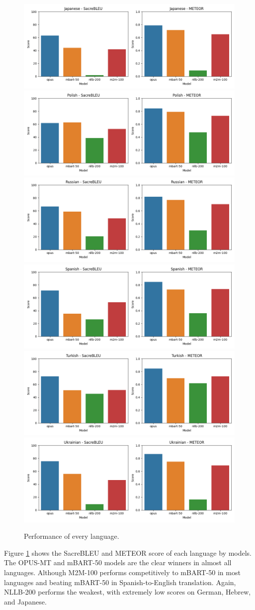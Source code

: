 \documentclass[a4paper]{article}
\begin{document}
\begin{figure}[htbp]
    \includegraphics[width=0.49\linewidth]{figures/japanese_all_metrics.png}
    \includegraphics[width=0.49\linewidth]{figures/polish_all_metrics.png}
    \includegraphics[width=0.49\linewidth]{figures/russian_all_metrics.png}
    \includegraphics[width=0.49\linewidth]{figures/spanish_all_metrics.png}
    \includegraphics[width=0.49\linewidth]{figures/turkish_all_metrics.png}
    \includegraphics[width=0.49\linewidth]{figures/ukrainian_all_metrics.png}
    \caption{Performance of every language.}
    \label{fig:lang_metrics}
\end{figure}

Figure \ref{fig:lang_metrics} shows the SacreBLEU and METEOR score of each language by models. The OPUS-MT and mBART-50 models are the clear winners in almost all languages. Although M2M-100 performs competitively to mBART-50 in most languages and beating mBART-50 in Spanish-to-English translation. Again, NLLB-200 performs the weakest, with extremely low scores on German, Hebrew, and Japanese.
\end{document}

